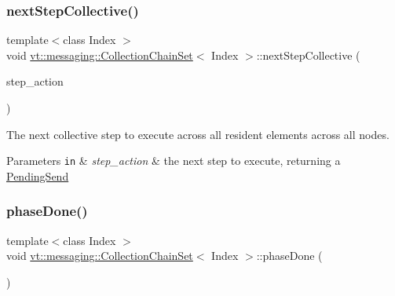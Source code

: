 \subsubsection{\texorpdfstring{next\+Step\+Collective()}{nextStepCollective()}\hspace{0.1cm}{\footnotesize\ttfamily [2/2]}}
{\footnotesize\ttfamily template$<$class Index $>$ \\
void \hyperlink{classvt_1_1messaging_1_1_collection_chain_set}{vt\+::messaging\+::\+Collection\+Chain\+Set}$<$ Index $>$\+::next\+Step\+Collective (\begin{DoxyParamCaption}\item[{std\+::function$<$ \hyperlink{structvt_1_1messaging_1_1_pending_send}{Pending\+Send}(Index)$>$}]{step\+\_\+action }\end{DoxyParamCaption})\hspace{0.3cm}{\ttfamily [inline]}}



The next collective step to execute across all resident elements across all nodes. 


\begin{DoxyParams}[1]{Parameters}
\mbox{\tt in}  & {\em step\+\_\+action} & the next step to execute, returning a {\ttfamily \hyperlink{structvt_1_1messaging_1_1_pending_send}{Pending\+Send}} \\
\hline
\end{DoxyParams}
\mbox{\label{classvt_1_1messaging_1_1_collection_chain_set_afcb749b22063068d060f35fdcd2320b3}} 
\subsubsection{\texorpdfstring{phase\+Done()}{phaseDone()}}
{\footnotesize\ttfamily template$<$class Index $>$ \\
void \hyperlink{classvt_1_1messaging_1_1_collection_chain_set}{vt\+::messaging\+::\+Collection\+Chain\+Set}$<$ Index $>$\+::phase\+Done (\begin{DoxyParamCaption}{ }\end{DoxyParamCaption})\hspace{0.3cm}{\ttfamily [inline]}}



